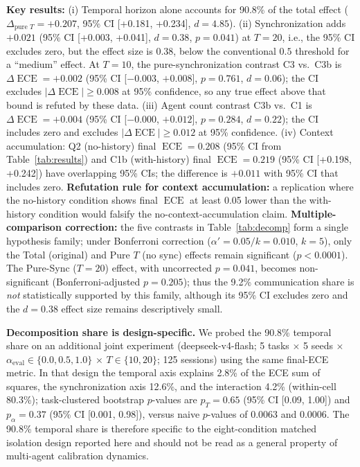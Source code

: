 \documentclass[11pt]{article}
\DeclareMathOperator{\ECE}{ECE}
\begin{document}
\textbf{Key results:} (i) Temporal horizon alone accounts for 90.8\% of the total effect ($\Delta_{\text{pure } T} = +0.207$, 95\% CI [+0.181, +0.234], $d = 4.85$). (ii) Synchronization adds $+0.021$ (95\% CI [+0.003, +0.041], $d = 0.38$, $p = 0.041$) at $T{=}20$, i.e., the 95\% CI excludes zero, but the effect size is $0.38$, below the conventional $0.5$ threshold for a ``medium'' effect. At $T{=}10$, the pure-synchronization contrast C3 vs.\ C3b is $\Delta\ECE = +0.002$ (95\% CI [$-0.003$, $+0.008$], $p = 0.761$, $d = 0.06$); the CI excludes $|\Delta\ECE| \geq 0.008$ at 95\% confidence, so any true effect above that bound is refuted by these data. (iii) Agent count contrast C3b vs.\ C1 is $\Delta\ECE = +0.004$ (95\% CI [$-0.000$, $+0.012$], $p = 0.284$, $d = 0.22$); the CI includes zero and excludes $|\Delta\ECE| \geq 0.012$ at 95\% confidence. (iv) Context accumulation: Q2 (no-history) final $\ECE = 0.208$ (95\% CI from Table~\ref{tab:results}) and C1b (with-history) final $\ECE = 0.219$ (95\% CI [+0.198, +0.242]) have overlapping 95\% CIs; the difference is $+0.011$ with 95\% CI that includes zero. \textbf{Refutation rule for context accumulation:} a replication where the no-history condition shows final $\ECE$ at least 0.05 lower than the with-history condition would falsify the no-context-accumulation claim. \textbf{Multiple-comparison correction:} the five contrasts in Table~\ref{tab:decomp} form a single hypothesis family; under Bonferroni correction ($\alpha' = 0.05/k = 0.010$, $k{=}5$), only the Total (original) and Pure $T$ (no sync) effects remain significant ($p < 0.0001$). The Pure-Sync ($T{=}20$) effect, with uncorrected $p = 0.041$, becomes non-significant (Bonferroni-adjusted $p = 0.205$); thus the 9.2\% communication share is \emph{not} statistically supported by this family, although its 95\% CI excludes zero and the $d = 0.38$ effect size remains descriptively small.

\textbf{Decomposition share is design-specific.} We probed the 90.8\% temporal share on an additional joint experiment (deepseek-v4-flash; 5 tasks $\times$ 5 seeds $\times$ $\alpha_{\mathrm{eval}} \in \{0.0, 0.5, 1.0\}$ $\times$ $T \in \{10, 20\}$; 125 sessions) using the same final-ECE metric. In that design the temporal axis explains 2.8\% of the ECE sum of squares, the synchronization axis 12.6\%, and the interaction 4.2\% (within-cell 80.3\%); task-clustered bootstrap $p$-values are $p_T = 0.65$ (95\% CI [0.09, 1.00]) and $p_{\alpha} = 0.37$ (95\% CI [0.001, 0.98]), versus naive $p$-values of $0.0063$ and $0.0006$. The 90.8\% temporal share is therefore specific to the eight-condition matched isolation design reported here and should not be read as a general property of multi-agent calibration dynamics.
\end{document}
